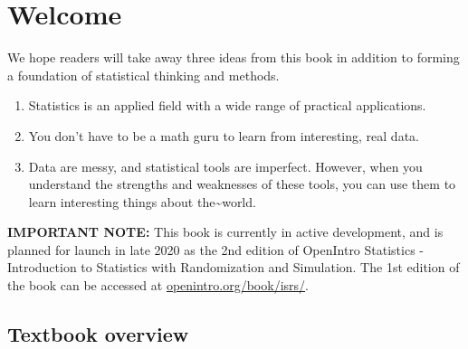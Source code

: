 \documentclass[]{book}
\title{}
\author{Mine Çetinkaya-Rundel, Johanna Hardin, David Diez, others\ldots{}}
\date{2020-01-09}
\providecommand{\tightlist}{%
  \setlength{\itemsep}{0pt}\setlength{\parskip}{0pt}}
\begin{document}
{
\setcounter{tocdepth}{1}
\tableofcontents
}
\hypertarget{welcome}{%
\chapter*{Welcome}\label{welcome}}

We hope readers will take away three ideas from this book in addition to forming a foundation of statistical thinking and methods.

\begin{enumerate}
\def\labelenumi{\arabic{enumi}.}
\tightlist
\item
  Statistics is an applied field with a wide range of practical applications.
\item
  You don't have to be a math guru to learn from interesting, real data.
\item
  Data are messy, and statistical tools are imperfect. However, when you understand the strengths and weaknesses of these tools, you can use them to learn interesting things about the\textasciitilde{}world.
\end{enumerate}

\textbf{IMPORTANT NOTE:} This book is currently in active development, and is planned for launch in late 2020 as the 2nd edition of OpenIntro Statistics - Introduction to Statistics with Randomization and Simulation. The 1st edition of the book can be accessed at \href{https://www.openintro.org/book/isrs/}{openintro.org/book/isrs/}.

\hypertarget{textbook-overview}{%
\section*{Textbook overview}\label{textbook-overview}}
\end{document}
